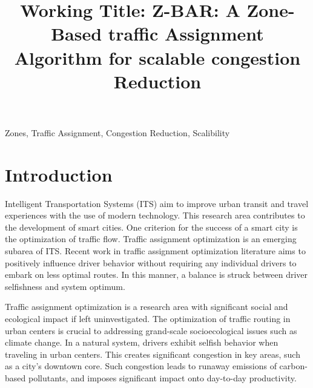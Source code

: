 \documentclass[conference]{IEEEtran}
\begin{document}
\raggedbottom

\title{Working Title: Z-BAR: A Zone-Based traffic Assignment Algorithm for scalable congestion Reduction}

\author{
}

\maketitle

\begin{abstract}


\end{abstract}

\begin{IEEEkeywords}
Zones, Traffic Assignment, Congestion Reduction, Scalibility
\end{IEEEkeywords}

\IEEEpeerreviewmaketitle

\section{Introduction}

Intelligent Transportation Systems (ITS) aim to improve urban transit and travel experiences with the use of modern technology. This research area contributes to the development of smart cities. One criterion for the success of a smart city is the optimization of traffic flow. Traffic assignment optimization is an emerging subarea of ITS. Recent work in traffic assignment optimization literature aims to positively influence driver behavior without requiring any individual drivers to embark on less optimal routes. In this manner, a balance is struck between driver selfishness and system optimum.

Traffic assignment optimization is a research area with significant social and ecological impact if left uninvestigated. The optimization of traffic routing in urban centers is crucial to addressing grand-scale socioecological issues such as climate change. In a natural system, drivers exhibit selfish behavior when traveling in urban centers. This creates significant congestion in key areas, such as a city's downtown core. Such congestion leads to runaway emissions of carbon-based pollutants, and imposes significant impact onto day-to-day productivity.
\end{document}
